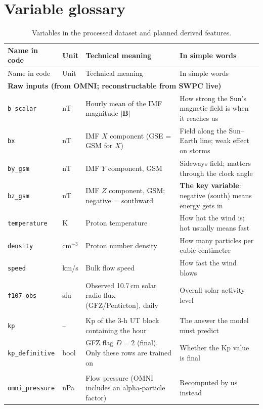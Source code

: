 \documentclass[11pt,a4paper]{article}
\newcommand{\code}[1]{\texttt{#1}}
\begin{document}
\section{Variable glossary}
\begin{longtable}{p{2.4cm}p{1.4cm}p{5.6cm}p{5.6cm}}
\caption{Variables in the processed dataset and planned derived features.}\\\toprule
Name in code & Unit & Technical meaning & In simple words\\\midrule\endfirsthead
\toprule Name in code & Unit & Technical meaning & In simple words\\\midrule\endhead
\multicolumn{4}{l}{\textbf{Raw inputs (from OMNI; reconstructable from SWPC live)}}\\
\code{b\_scalar} & nT & Hourly mean of the IMF magnitude $|\mathbf{B}|$ & How strong the Sun's magnetic field is when it reaches us\\
\code{bx} & nT & IMF $X$ component (GSE = GSM for $X$) & Field along the Sun--Earth line; weak effect on storms\\
\code{by\_gsm} & nT & IMF $Y$ component, GSM & Sideways field; matters through the clock angle\\
\code{bz\_gsm} & nT & IMF $Z$ component, GSM; negative = southward & \textbf{The key variable}: negative (south) means energy gets in\\
\code{temperature} & K & Proton temperature & How hot the wind is; hot usually means fast\\
\code{density} & cm$^{-3}$ & Proton number density & How many particles per cubic centimetre\\
\code{speed} & km/s & Bulk flow speed & How fast the wind blows\\
\code{f107\_obs} & sfu & Observed 10.7\,cm solar radio flux (GFZ/Penticton), daily & Overall solar activity level\\\addlinespace
\multicolumn{4}{l}{\textbf{Target and flags}}\\
\code{kp} & -- & Kp of the 3-h UT block containing the hour & The answer the model must predict\\
\code{kp\_definitive} & bool & GFZ flag $D=2$ (final). Only these rows are trained on & Whether the Kp value is final\\\addlinespace
\multicolumn{4}{l}{\textbf{OMNI precomputed (validation only, never features)}}\\
\code{omni\_pressure} & nPa & Flow pressure (OMNI includes an alpha-particle factor) & Recomputed by us instead\\

\end{longtable}
\end{document}
